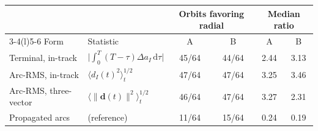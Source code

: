 \begin{tabular}{@{}l l cc cc@{}}
\toprule
 & & \multicolumn{2}{c}{Orbits favoring radial} & \multicolumn{2}{c}{Median ratio} \\
\cmidrule(lr){3-4}\cmidrule(l){5-6}
Form & Statistic & A & B & A & B \\
\midrule
Terminal, in-track & $\lvert\int_0^T(T-\tau)\Delta a_I\,\mathrm d\tau\rvert$ & 45/64 & 44/64 & 2.44 & 3.13 \\
Arc-RMS, in-track & $\langle d_I(t)^2\rangle_t^{1/2}$ & 47/64 & 47/64 & 3.25 & 3.46 \\
Arc-RMS, three-vector & $\langle\lVert\mathbf d(t)\rVert^2\rangle_t^{1/2}$ & 46/64 & 47/64 & 3.27 & 2.31 \\
\midrule
Propagated arcs & (reference) & 11/64 & 15/64 & 0.24 & 0.19 \\
\bottomrule
\end{tabular}
